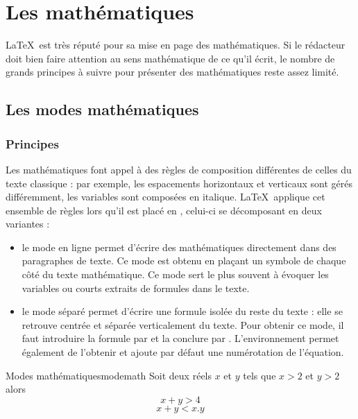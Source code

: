 
\chapter{Les mathématiques}  \label{mathématique}

\LaTeX\ est très réputé pour sa mise en page des mathématiques. Si le rédacteur doit bien faire attention au sens mathématique de ce qu'il écrit, le nombre de grands principes à suivre pour présenter des mathématiques reste assez limité. 

\section{Les modes mathématiques}

\subsection{Principes}
Les mathématiques font appel à des règles de composition différentes de celles du texte classique : par exemple, les espacements horizontaux et verticaux sont gérés différemment, les variables sont composées en italique. \LaTeX\ applique cet ensemble de règles lors qu'il est placé en , celui-ci se décomposant en deux variantes : 
\begin{itemize}
\item le mode en ligne permet d'écrire des mathématiques directement dans des paragraphes de texte. Ce mode est obtenu en plaçant un symbole \macron{\$} de chaque côté du texte mathématique. Ce mode sert le plus souvent à évoquer les variables ou courts extraits de formules dans le texte.
\item le mode séparé permet d'écrire une formule isolée du reste du texte : elle se retrouve centrée et séparée verticalement du texte. Pour obtenir ce mode, il faut introduire la formule par \macro{[} et la conclure par \macro{]}. L'environnement  permet également de l'obtenir et ajoute par défaut une numérotation de l'équation.
\end{itemize}

\begin{codedouble}{Modes mathématiques}{modemath}
Soit deux réels $x$ et $y$ tels que $x>2$ et $y>2$ alors \[ x+y>4 \]
\begin{equation}
x+y < x.y 
\end{equation}
\end{codedouble}

